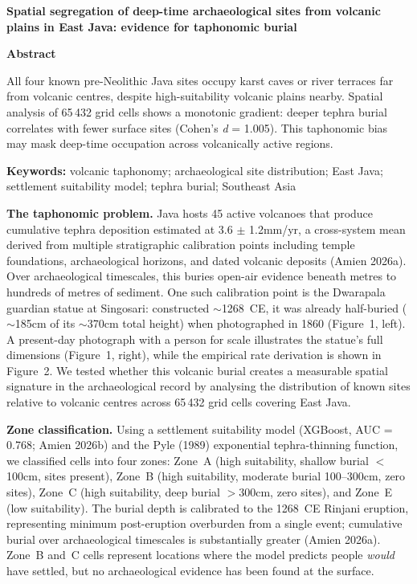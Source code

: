 \documentclass[12pt]{article}
\begin{document}
{\large\bfseries Spatial segregation of deep-time archaeological sites from volcanic plains in East Java: evidence for taphonomic burial}

\vspace{12pt}

\textbf{Abstract}

All four known pre-Neolithic Java sites occupy karst caves or river terraces far from volcanic centres, despite high-suitability volcanic plains nearby. Spatial analysis of 65\,432 grid cells shows a monotonic gradient: deeper tephra burial correlates with fewer surface sites (Cohen's \textit{d} = 1.005). This taphonomic bias may mask deep-time occupation across volcanically active regions.

\vspace{6pt}

\textbf{Keywords:} volcanic taphonomy; archaeological site distribution; East Java; settlement suitability model; tephra burial; Southeast Asia

\vspace{12pt}

\textbf{The taphonomic problem.}
Java hosts 45 active volcanoes that produce cumulative tephra deposition estimated at 3.6 $\pm$ 1.2mm/yr, a cross-system mean derived from multiple stratigraphic calibration points including temple foundations, archaeological horizons, and dated volcanic deposits (Amien 2026a).
Over archaeological timescales, this buries open-air evidence beneath metres to hundreds of metres of sediment.
One such calibration point is the Dwarapala guardian statue at Singosari: constructed $\sim$1268~CE, it was already half-buried ($\sim$185cm of its $\sim$370cm total height) when photographed in 1860 (Figure~1, left). A present-day photograph with a person for scale illustrates the statue's full dimensions (Figure~1, right), while the empirical rate derivation is shown in Figure~2.
We tested whether this volcanic burial creates a measurable spatial signature in the archaeological record by analysing the distribution of known sites relative to volcanic centres across 65\,432 grid cells covering East Java.

\textbf{Zone classification.}
Using a settlement suitability model (XGBoost, AUC = 0.768; Amien 2026b) and the Pyle (1989) exponential tephra-thinning function, we classified cells into four zones: Zone~A (high suitability, shallow burial $<$100cm, sites present), Zone~B (high suitability, moderate burial 100--300cm, zero sites), Zone~C (high suitability, deep burial $>$300cm, zero sites), and Zone~E (low suitability).
The burial depth is calibrated to the 1268~CE Rinjani eruption, representing minimum post-eruption overburden from a single event; cumulative burial over archaeological timescales is substantially greater (Amien 2026a).
Zone~B and~C cells represent locations where the model predicts people \textit{would} have settled, but no archaeological evidence has been found at the surface.
\end{document}
